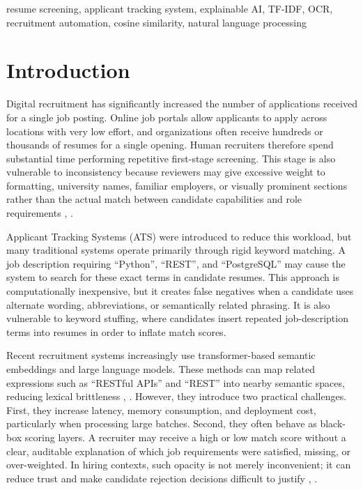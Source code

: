 \documentclass[conference]{IEEEtran}
\begin{document}
\begin{IEEEkeywords}
resume screening, applicant tracking system, explainable AI, TF-IDF, OCR, recruitment automation, cosine similarity, natural language processing
\end{IEEEkeywords}

\section{Introduction}
Digital recruitment has significantly increased the number of applications received for a single job posting. Online job portals allow applicants to apply across locations with very low effort, and organizations often receive hundreds or thousands of resumes for a single opening. Human recruiters therefore spend substantial time performing repetitive first-stage screening. This stage is also vulnerable to inconsistency because reviewers may give excessive weight to formatting, university names, familiar employers, or visually prominent sections rather than the actual match between candidate capabilities and role requirements \cite{b3}, \cite{b10}.

Applicant Tracking Systems (ATS) were introduced to reduce this workload, but many traditional systems operate primarily through rigid keyword matching. A job description requiring ``Python'', ``REST'', and ``PostgreSQL'' may cause the system to search for these exact terms in candidate resumes. This approach is computationally inexpensive, but it creates false negatives when a candidate uses alternate wording, abbreviations, or semantically related phrasing. It is also vulnerable to keyword stuffing, where candidates insert repeated job-description terms into resumes in order to inflate match scores.

Recent recruitment systems increasingly use transformer-based semantic embeddings and large language models. These methods can map related expressions such as ``RESTful APIs'' and ``REST'' into nearby semantic spaces, reducing lexical brittleness \cite{b6}, \cite{b12}. However, they introduce two practical challenges. First, they increase latency, memory consumption, and deployment cost, particularly when processing large batches. Second, they often behave as black-box scoring layers. A recruiter may receive a high or low match score without a clear, auditable explanation of which job requirements were satisfied, missing, or over-weighted. In hiring contexts, such opacity is not merely inconvenient; it can reduce trust and make candidate rejection decisions difficult to justify \cite{b8}, \cite{b14}.
\end{document}
